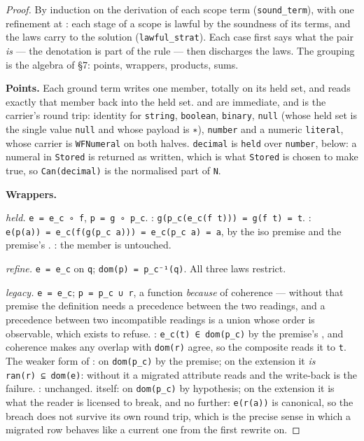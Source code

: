 \begin{proof}
\leanok
By induction on the derivation of each scope term (\texttt{sound\_term}), with one refinement at
: each stage of a scope is lawful by the soundness of its terms, and the laws carry
to the solution (\texttt{lawful\_strat}). Each case
first says what the pair \emph{is} — the denotation is part of the rule — then discharges the laws. The
grouping is the algebra of §7: points, wrappers, products, sums.

\textbf{Points.} Each ground term writes one member, totally on its held set, and reads exactly that
member back into the held set.  and  are immediate, and
 is the carrier's round trip: identity for \texttt{string}, \texttt{boolean}, \texttt{binary},
\texttt{null} (whose held set is the single value \texttt{null} and whose payload is \texttt{∗}), \texttt{number} and a numeric
\texttt{literal}, whose carrier is \texttt{WFNumeral} on both halves. \texttt{decimal} is \texttt{held} over \texttt{number}, below: a
numeral in \texttt{Stored} is returned as written, which is what \texttt{Stored} is chosen to make true, so
\texttt{Can(decimal)} is the normalised part of \texttt{N}.

\textbf{Wrappers.}

\emph{held.} \texttt{e\ =\ e\_c\ ∘\ f}, \texttt{p\ =\ g\ ∘\ p\_c}. : \texttt{g(p\_c(e\_c(f\ t)))\ =\ g(f\ t)\ =\ t}. :
\texttt{e(p(a))\ =\ e\_c(f(g(p\_c\ a)))\ =\ e\_c(p\_c\ a)\ =\ a}, by the iso premise and the premise's
. : the member is untouched.

\emph{refine.} \texttt{e\ =\ e\_c} on \texttt{q}; \texttt{dom(p)\ =\ p\_c⁻¹(q)}. All three laws restrict.

\emph{legacy.} \texttt{e\ =\ e\_c}; \texttt{p\ =\ p\_c\ ∪\ r}, a function \emph{because} of coherence — without that premise the
definition needs a precedence between the two readings, and a precedence between two incompatible
readings is a union whose order is observable, which  exists to refuse. : \texttt{e\_c(t)\ ∈\ dom(p\_c)}
by the premise's , and coherence makes any overlap with \texttt{dom(r)} agree, so the composite
reads it to \texttt{t}. The weaker form of : on \texttt{dom(p\_c)} by the premise; on the
extension it \emph{is} \texttt{ran(r)\ ⊆\ dom(e)}: without it a migrated attribute reads and the write-back
is the failure. : unchanged.  itself: on \texttt{dom(p\_c)} by
hypothesis; on the extension it is what the reader is licensed to break, and no further: \texttt{e(r(a))} is canonical, so the breach does not survive its
own round trip, which is the precise sense in which a migrated row behaves like a current one from
the first rewrite on.


\end{proof}
